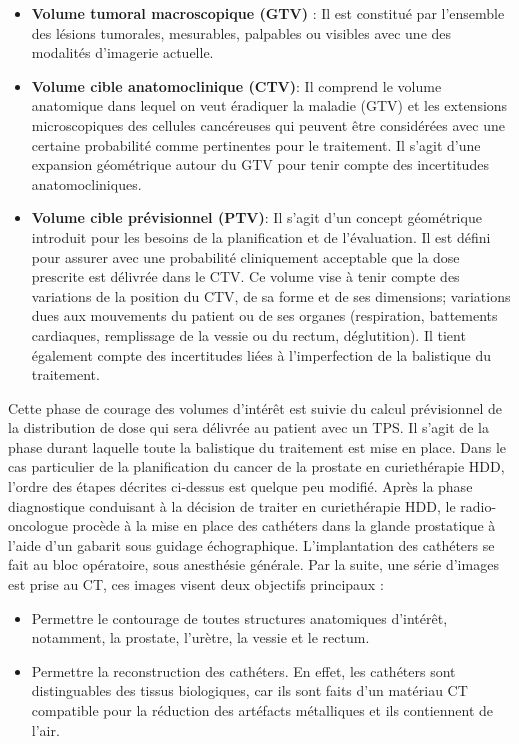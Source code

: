\begin{itemize}[label=\textbullet, font=\LARGE]
\item \textbf{Volume tumoral macroscopique (GTV)} :  \newline
Il est constitué par l’ensemble des lésions tumorales, mesurables, palpables ou visibles avec une des modalités d’imagerie actuelle. 
%
\item \textbf{Volume cible anatomoclinique (CTV)}: \newline
Il comprend le volume anatomique dans lequel on veut éradiquer la maladie (GTV) et les extensions microscopiques des cellules cancéreuses qui peuvent être considérées avec une certaine probabilité comme pertinentes pour le traitement. Il s’agit d’une expansion géométrique autour du GTV pour tenir compte des incertitudes anatomocliniques.
%
\item \textbf{Volume cible prévisionnel (PTV)}: \newline
Il s’agit d’un concept géométrique introduit pour les besoins de la planification et de l’évaluation. Il est défini pour assurer avec une probabilité cliniquement acceptable que la dose prescrite est délivrée dans le CTV. Ce volume vise à tenir compte des variations de la position du CTV, de sa forme et de ses dimensions; variations dues aux mouvements du patient ou de ses organes (respiration, battements cardiaques, remplissage de la vessie ou du rectum, déglutition). Il tient également compte des incertitudes liées à l'imperfection de la balistique du traitement.
%
\end{itemize}
%
Cette phase de courage des volumes d’intérêt est suivie du calcul prévisionnel de la distribution de dose qui sera délivrée au patient avec un TPS. Il s’agit de la phase durant laquelle toute la balistique du traitement est mise en place.\newline
Dans le cas particulier de la planification du cancer de la prostate en curiethérapie HDD, l’ordre des étapes décrites ci-dessus est quelque peu modifié. Après la phase diagnostique conduisant à la décision de traiter en curiethérapie HDD, le radio-oncologue procède à la mise en place des cathéters dans la glande prostatique à l’aide d’un gabarit sous guidage échographique. L'implantation des cathéters se fait au bloc opératoire, sous anesthésie générale. Par la suite, une série d’images est prise au CT, ces images visent deux objectifs principaux :
%
\begin{itemize}[label=\textbullet, font=\LARGE]
	\item Permettre le contourage de toutes structures anatomiques d'intérêt, notamment, la prostate, l'urètre, la vessie et le 	rectum.
	\item Permettre la reconstruction des cathéters. En effet, les cathéters sont distinguables des tissus biologiques, car ils 	sont faits d’un matériau CT compatible pour la réduction des artéfacts métalliques et ils contiennent de l’air.
\end{itemize}
